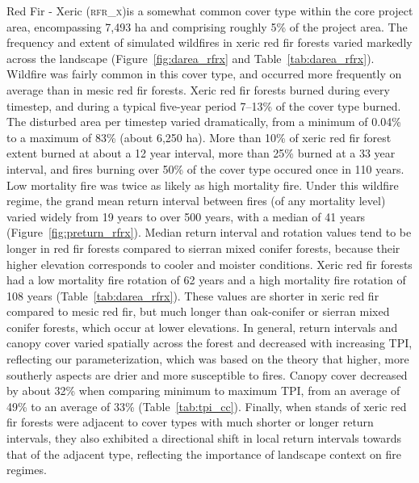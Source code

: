 Red Fir - Xeric (\textsc{rfr\_x})is a somewhat common cover type within the core project area, encompassing 7,493 ha and comprising roughly 5\% of the project area. The frequency and extent of simulated wildfires in xeric red fir forests varied markedly across the landscape (Figure~\ref{fig:darea_rfrx} and Table~\ref{tab:darea_rfrx}). %
%
Wildfire was fairly common in this cover type, and occurred more frequently on average than in mesic red fir forests. Xeric red fir forests burned during every timestep, and during a typical five-year period 7--13\% of the cover type burned. The disturbed area per timestep varied dramatically, from a minimum of 0.04\% to a maximum of 83\% (about 6,250 ha). More than 10\% of xeric red fir forest extent burned at about a 12 year interval, more than 25\% burned at a 33 year interval, and fires burning over 50\% of the cover type occured once in 110 years. Low mortality fire was twice as likely as high mortality fire. %
%
Under this wildfire regime, the grand mean return interval between fires (of any mortality level) varied widely from 19 years to over 500 years, with a median of 41 years (Figure~\ref{fig:preturn_rfrx}). Median return interval and rotation values tend to be longer in red fir forests compared to sierran mixed conifer forests, because their higher elevation corresponds to cooler and moister conditions. Xeric red fir forests had a low mortality fire rotation of 62 years and a high mortality fire rotation of 108 years (Table~\ref{tab:darea_rfrx}). These values are shorter in xeric red fir compared to mesic red fir, but much longer than oak-conifer or sierran mixed conifer forests, which occur at lower elevations. %
%
In general, return intervals and canopy cover varied spatially across the forest and decreased with increasing TPI, reflecting our parameterization, which was based on the theory that higher, more southerly aspects are drier and more susceptible to fires. Canopy cover decreased by about 32\% when comparing minimum to maximum TPI, from an average of 49\% to an average of 33\% (Table~\ref{tab:tpi_cc}). %
%
Finally, when stands of xeric red fir forests were adjacent to cover types with much shorter or longer return intervals, they also exhibited a directional shift in local return intervals towards that of the adjacent type, reflecting the importance of landscape context on fire regimes.

